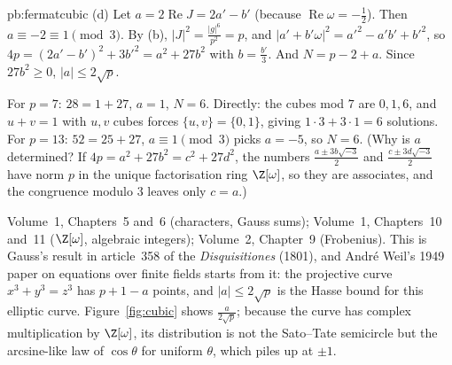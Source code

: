 \begin{solution}{pb:fermatcubic}
(d) Let $a=2\operatorname{Re}J=2a'-b'$ (because $\operatorname{Re}\omega=-\frac12$). Then $a\equiv-2\equiv1\pmod 3$. By (b),
$|J|^2=\frac{|g|^6}{p^2}=p$, and $|a'+b'\omega|^2=a'^2-a'b'+b'^2$, so $4p=(2a'-b')^2+3b'^2=a^2+27b^2$ with $b=\frac{b'}3$. And
$N=p-2+a$. Since $27b^2\ge0$, $|a|\le2\sqrt p$.

For $p=7$: $28=1+27$, $a=1$, $N=6$. Directly: the cubes mod $7$ are $0,1,6$, and $u+v=1$ with $u,v$ cubes forces $\{u,v\}=\{0,1\}$,
giving $1\cdot3+3\cdot1=6$ solutions. For $p=13$: $52=25+27$, $a\equiv1\pmod3$ picks $a=-5$, so $N=6$. (Why is $a$ determined?
If $4p=a^2+27b^2=c^2+27d^2$, the numbers $\frac{a\pm3b\sqrt{-3}}2$ and $\frac{c\pm3d\sqrt{-3}}2$ have norm $p$ in the unique
factorisation ring $\Z[\omega]$, so they are associates, and the congruence modulo $3$ leaves only $c=a$.)

\tools Volume~1, Chapters~5 and~6 (characters, Gauss sums); Volume~1, Chapters~10 and~11 ($\Z[\omega]$, algebraic integers); Volume~2, Chapter~9 (Frobenius).
\leads This is Gauss's result in article~358 of the \emph{Disquisitiones} (1801), and André Weil's 1949 paper on equations over
finite fields starts from it: the projective curve $x^3+y^3=z^3$ has $p+1-a$ points, and $|a|\le2\sqrt p$ is the Hasse bound for
this elliptic curve. Figure~\ref{fig:cubic} shows $\frac a{2\sqrt p}$; because the curve has complex multiplication by $\Z[\omega]$,
its distribution is not the Sato--Tate semicircle but the arcsine-like law of $\cos\theta$ for uniform $\theta$, which piles up at
$\pm1$.
\end{solution}

